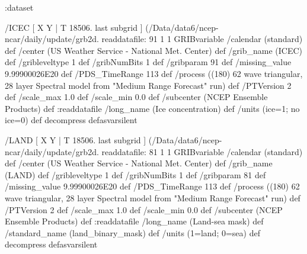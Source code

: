 \begin{ingrid}
  :dataset

  /ICEC { [ X Y | T 18506. last subgrid ] (/Data/data6/ncep-ncar/daily/update/grb2d.%
  readdatafile:
  91 1 1 GRIBvariable
  /calendar (standard) def
  /center (US Weather Service - National Met. Center) def
  /grib_name (ICEC) def
  /gribleveltype 1 def
  /gribNumBits 1 def
  /gribparam 91 def
  /missing_value 9.99900026E20 def 
  /PDS_TimeRange 113 def
  /process ((180) 62 wave triangular, 28 layer Spectral model from "Medium Range Forecast" run) def
  /PTVersion 2 def
  /scale_max 1.0 def
  /scale_min 0.0 def
  /subcenter (NCEP Ensemble Products) def
  :readdatafile
  /long_name (Ice concentration) def
  /units (ice=1; no ice=0) def
  decompress
  } defasvarsilent
  
  /LAND { [ X Y | T 18506. last subgrid ] (/Data/data6/ncep-ncar/daily/update/grb2d.%
  readdatafile:
  81 1 1 GRIBvariable
  /calendar (standard) def
  /center (US Weather Service - National Met. Center) def
  /grib_name (LAND) def
  /gribleveltype 1 def
  /gribNumBits 1 def
  /gribparam 81 def
  /missing_value 9.99900026E20 def 
  /PDS_TimeRange 113 def
  /process ((180) 62 wave triangular, 28 layer Spectral model from "Medium Range Forecast" run) def
  /PTVersion 2 def
  /scale_max 1.0 def
  /scale_min 0.0 def
  /subcenter (NCEP Ensemble Products) def
  :readdatafile
  /long_name (Land-sea mask) def
  /standard_name (land_binary_mask) def
  /units (1=land; 0=sea) def
  decompress
  } defasvarsilent

\end{ingrid}

